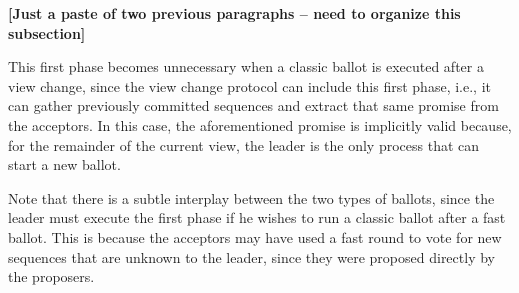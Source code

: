 {\bf [Just a paste of two previous paragraphs -- need to organize this subsection]}

 This first phase becomes unnecessary when a classic ballot is executed after a view change, since the view change protocol can include this first phase, i.e., it can gather previously committed sequences and extract that same promise from the acceptors. In this case, the aforementioned promise is implicitly valid because, for the remainder of the current view, the leader is the only process that can start a new ballot.

 Note that there is a subtle interplay between the two types of ballots, since the leader must execute the first phase if he wishes to run a classic ballot after a fast ballot. This is because the acceptors may have used a fast round to vote for new sequences that are unknown to the leader, since they were proposed directly by the proposers.
\fi
